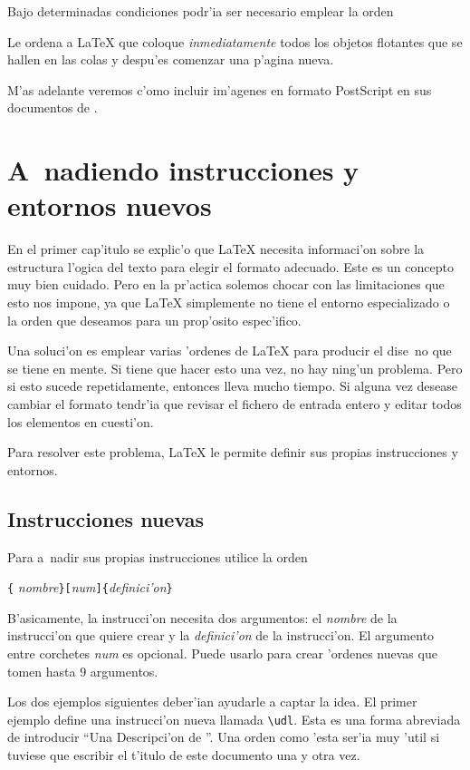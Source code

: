 Bajo determinadas condiciones podr'ia ser necesario emplear la orden
\begin{command}
\end{command}
\noindent Le ordena a \LaTeX{} que coloque \emph{inmediatamente} todos
los objetos flotantes que se hallen en las colas y despu'es comenzar
una p'agina nueva.

M'as adelante veremos c'omo incluir im'agenes en formato PostScript en
sus documentos de \LaTeXe.


\section{A~nadiendo instrucciones y entornos nuevos}

En el primer cap'itulo se explic'o que \LaTeX{} necesita informaci'on
sobre la estructura l'ogica del texto para elegir el formato
adecuado. Este es un concepto muy bien cuidado. Pero en la pr'actica
solemos chocar con las limitaciones que esto nos impone, ya que
\LaTeX{} simplemente no tiene el entorno especializado o la orden que
deseamos para un prop'osito espec'ifico.

Una soluci'on es emplear varias 'ordenes de \LaTeX{} para producir el
dise~no que se tiene en mente. Si tiene que hacer esto una vez, no hay
ning'un problema. Pero si esto sucede repetidamente, entonces lleva
mucho tiempo. Si alguna vez desease cambiar el formato tendr'ia que
revisar el fichero de entrada entero y editar todos los elementos en
cuesti'on.

Para resolver este problema, \LaTeX{} le permite definir sus propias
instrucciones y entornos.

\subsection{Instrucciones nuevas}

Para a~nadir sus propias instrucciones utilice la orden
\begin{command}
\verb|{|%
   \emph{nombre}\verb|}[|\emph{num}\verb|]{|\emph{definici'on}\verb|}|
\end{command}
\noindent B'asicamente, la instrucci'on necesita dos argumentos: el
\emph{nombre} de la instrucci'on que quiere crear y la
\emph{definici'on} de la instrucci'on. El argumento entre corchetes
\emph{num} es opcional. Puede usarlo para crear 'ordenes nuevas que
tomen hasta 9 argumentos.

Los dos ejemplos siguientes deber'ian ayudarle a captar la idea. El
primer ejemplo define una instrucci'on nueva llamada
\verb|\udl|. Esta es una forma abreviada de introducir ``Una
Descripci'on de \LaTeXe''. Una orden como 'esta ser'ia muy 'util si
tuviese que escribir el t'itulo de este documento una y otra vez.

